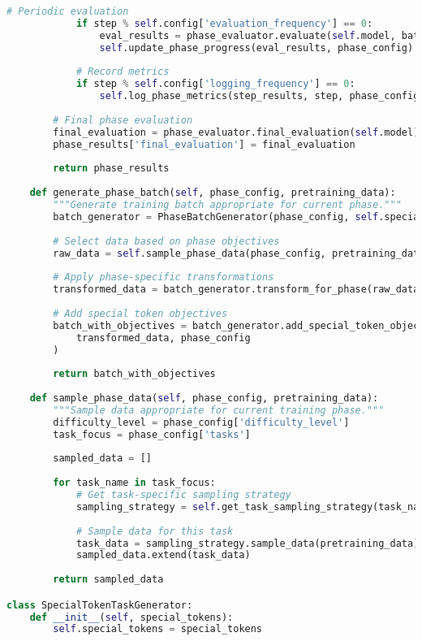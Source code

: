 \begin{lstlisting}[language=Python, caption=Progressive curriculum framework for special token pretraining]
            # Periodic evaluation
            if step % self.config['evaluation_frequency'] == 0:
                eval_results = phase_evaluator.evaluate(self.model, batch)
                self.update_phase_progress(eval_results, phase_config)
            
            # Record metrics
            if step % self.config['logging_frequency'] == 0:
                self.log_phase_metrics(step_results, step, phase_config)
        
        # Final phase evaluation
        final_evaluation = phase_evaluator.final_evaluation(self.model)
        phase_results['final_evaluation'] = final_evaluation
        
        return phase_results
    
    def generate_phase_batch(self, phase_config, pretraining_data):
        """Generate training batch appropriate for current phase."""
        batch_generator = PhaseBatchGenerator(phase_config, self.special_tokens)
        
        # Select data based on phase objectives
        raw_data = self.sample_phase_data(phase_config, pretraining_data)
        
        # Apply phase-specific transformations
        transformed_data = batch_generator.transform_for_phase(raw_data, phase_config)
        
        # Add special token objectives
        batch_with_objectives = batch_generator.add_special_token_objectives(
            transformed_data, phase_config
        )
        
        return batch_with_objectives
    
    def sample_phase_data(self, phase_config, pretraining_data):
        """Sample data appropriate for current training phase."""
        difficulty_level = phase_config['difficulty_level']
        task_focus = phase_config['tasks']
        
        sampled_data = []
        
        for task_name in task_focus:
            # Get task-specific sampling strategy
            sampling_strategy = self.get_task_sampling_strategy(task_name, difficulty_level)
            
            # Sample data for this task
            task_data = sampling_strategy.sample_data(pretraining_data)
            sampled_data.extend(task_data)
        
        return sampled_data

class SpecialTokenTaskGenerator:
    def __init__(self, special_tokens):
        self.special_tokens = special_tokens
        

\end{lstlisting}
